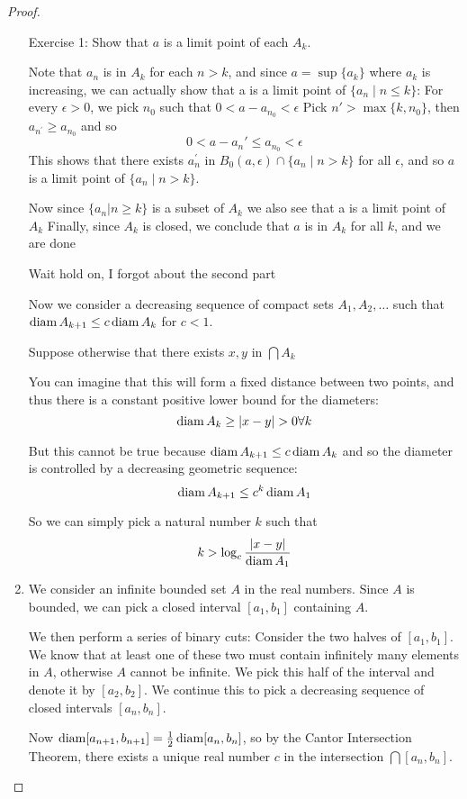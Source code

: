 \begin{proof}
\begin{enumerate}[label=(\alph*)]
Exercise 1: Show that $a$ is a limit point of each $A_k$.

Note that $a_n$ is in $A_k$ for each $n>k$, and since $a=\sup\{a_k\}$ where $a_k$ is increasing, we can actually show that a is a limit point of $\{a_n \mid n \le k\}$:
For every $\epsilon>0$, we pick $n_0$ such that $0 < a-a_{n_0} < \epsilon$
Pick $n\prime > \max\{k,n_0\}$, then $a_{n^\prime} \ge a_{n_0}$ and so
\[ 0<a-a_n\prime \le a_{n_0} < \epsilon \]
This shows that there exists $a_n^\prime$ in $B_0(a,\epsilon) \cap \{a_n \mid n>k\}$ for all $\epsilon$, and so $a$ is a limit point of $\{a_n \mid n>k\}$.

Now since $\{a_n|n \ge k\}$ is a subset of $A_k$ we also see that a is a limit point of $A_k$
Finally, since $A_k$ is closed, we conclude that $a$ is in $A_k$ for all $k$, and we are done

Wait hold on, I forgot about the second part

Now we consider a decreasing sequence of compact sets $A_1, A_2, \dots$ such that $\operatorname{diam} A_{k+1} \le c \operatorname{diam} A_k$ for $c<1$.

Suppose otherwise that there exists $x, y$ in $\bigcap A_k$

You can imagine that this will form a fixed distance between two points, and thus there is a constant positive lower bound for the diameters:
\[ \operatorname{diam} A_k \ge |x-y| > 0 \forall k \]

But this cannot be true because $\operatorname{diam} A_{k+1} \le c \operatorname{diam} A_k$ and so the diameter is controlled by a decreasing geometric sequence:
\[ \operatorname{diam} A_{k+1} \le c^k \operatorname{diam} A_1 \]

So we can simply pick a natural number $k$ such that
\[ k > \log_c \frac{|x-y|}{\operatorname{diam} A_1} \]

\item We consider an infinite bounded set $A$ in the real numbers. Since $A$ is bounded, we can pick a closed interval $[a_1,b_1]$ containing $A$.

We then perform a series of binary cuts: Consider the two halves of $[a_1,b_1]$. We know that at least one of these two must contain infinitely many elements in $A$, otherwise $A$ cannot be infinite. We pick this half of the interval and denote it by $[a_2,b_2]$. We continue this to pick a decreasing sequence of closed intervals $[a_n,b_n]$.

Now $\operatorname{diam} [a_{n+1},b_{n+1}] = \frac{1}{2} \operatorname{diam} [a_n,b_n]$, so by the Cantor Intersection Theorem, there exists a unique real number $c$ in the intersection $\bigcap[a_n,b_n]$.


\end{enumerate}
\end{proof}
